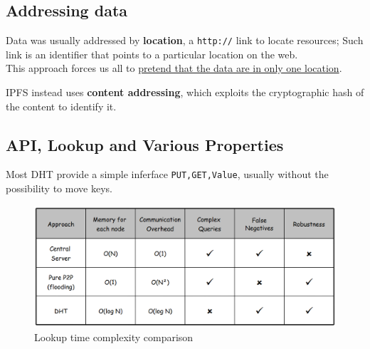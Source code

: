 \subsection{Addressing data}
Data was usually addressed by \textbf{location}, a \texttt{http://} link to locate resources;
Such link is an identifier that points to a particular location on the web.\\
This approach forces us all to \ul{pretend that the data are in only one location}.

IPFS instead uses \textbf{content addressing}, which exploits the cryptographic hash of the content to identify it.

\subsection{API, Lookup and Various Properties}
Most DHT provide a simple inferface \texttt{PUT,GET,Value}, usually without the possibility to move keys.

\begin{figure}[htbp]
   \centering
   \includegraphics{images/DHT_lookupcomplexity.png}
   \caption{Lookup time complexity comparison}
   \label{fig:DHT_lookupcomplexity}
\end{figure}

